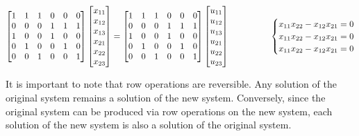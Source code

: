 \documentclass{article}
\begin{document}
    \begin{align*}
    \begin{bmatrix}
       1 & 1 & 1 & 0 & 0 & 0\\
       0 & 0 & 0 & 1 & 1 & 1\\
       1 & 0 & 0 & 1 & 0 & 0\\
       0 & 1 & 0 & 0 & 1 & 0\\
       0 & 0 & 1 & 0 & 0 & 1\\
           \end{bmatrix}
     \begin{bmatrix}
       x_{11} \\
       x_{12} \\
       x_{13} \\
       x_{21}\\
       x_{22}\\
       x_{23}\\
      \end{bmatrix}
        &=
    \begin{bmatrix}
       1 & 1 & 1 & 0 & 0 & 0\\
       0 & 0 & 0 & 1 & 1 & 1\\
       1 & 0 & 0 & 1 & 0 & 0\\
       0 & 1 & 0 & 0 & 1 & 0\\
       0 & 0 & 1 & 0 & 0 & 1\\
           \end{bmatrix}
     \begin{bmatrix}
       u_{11} \\
       u_{12} \\
       u_{13} \\
       u_{21}\\
       u_{22}\\
       u_{23}\\
      \end{bmatrix}%
       & \hspace{ 4em}%
      \begin{cases} x_{11}x_{22}-x_{12}x_{21}=0 \\
      x_{11}x_{22}-x_{12}x_{21}=0 \\
      x_{11}x_{22}-x_{12}x_{21}=0 \\
     \end{cases}\hspace{-1em}
    \end{align*}

It is important to note that row operations are reversible. Any solution of the original system remains a solution of the new system. Conversely, since the original system can be produced via row operations on the new system, each solution of the new system is also a solution of the original system.
\end{document}
